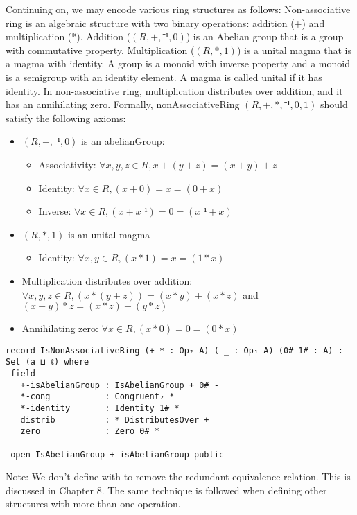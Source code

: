 Continuing on, we may encode various ring structures as follows: Non-associative
ring is an algebraic structure with two binary operations: addition (+) and
multiplication (*). Addition ($(R,+,⁻¹,0)$) is an Abelian group that is a group
with commutative property. Multiplication ($(R,*,1)$) is a unital magma that is
a magma with identity. A group is a monoid with inverse property and a monoid is
a semigroup with an identity element. A magma is called unital if it has
identity. In non-associative ring, multiplication distributes over addition, and
it has an annihilating zero. Formally, nonAssociativeRing $(R,+,*,⁻¹,0,1)$
should satisfy the following axioms:
\begin{itemize}
  \item $(R,+,⁻¹,0)$ is an abelianGroup:
   \begin{itemize}
    \item Associativity: $\forall x,y,z \in R, x + (y + z) = (x + y) + z$
    \item Identity: $\forall x \in R, (x + 0) = x = (0 + x)$
    \item Inverse: $\forall x \in R, (x + x⁻¹) = 0 = (x⁻¹ + x)$
  \end{itemize}
  \item $(R,*,1)$ is an unital magma
  \begin{itemize}
    \item Identity: $\forall x,y \in R, (x * 1) = x = (1 * x)$
  \end{itemize}
  \item Multiplication distributes over addition: \(\forall x , y , z \in R, (x * (y + z)) = (x * y) + (x
  * z)\) and \( (x + y) * z = (x * z) + (y * z) \)
  \item Annihilating zero: \(\forall x \in R, (x * 0) = 0 = (0 * x)\)
\end{itemize}
\begin{verbatim}
record IsNonAssociativeRing (+ * : Op₂ A) (-_ : Op₁ A) (0# 1# : A) : Set (a ⊔ ℓ) where
 field
   +-isAbelianGroup : IsAbelianGroup + 0# -_
   *-cong           : Congruent₂ *
   *-identity       : Identity 1# *
   distrib          : * DistributesOver +
   zero             : Zero 0# *

 open IsAbelianGroup +-isAbelianGroup public
\end{verbatim}

Note: We don't define  with
 to remove the redundant equivalence relation. This is
discussed in Chapter 8. The same technique is followed when defining other
structures with more than one operation.

